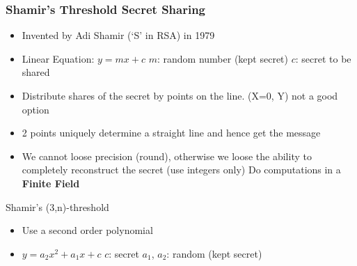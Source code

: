 \subsubsection{Shamir's Threshold Secret Sharing}
\begin{itemize}
	\item Invented by Adi Shamir (`S' in RSA) in 1979
	\item Linear Equation: $y=mx+c$
	\subitem $m$: random number (kept secret)
	\subitem $c$: secret to be shared
	\item Distribute shares of the secret by points on the line. (X=0, Y) not a good option
	\item 2 points uniquely determine a straight line and hence get the message
	\item We cannot loose precision (round), otherwise we loose the ability to completely reconstruct the secret (use integers only)
	\subitem Do computations in a \textbf{Finite Field}
\end{itemize}
\begin{note}{Shamir's (3,n)-threshold}
	\begin{itemize}
		\item Use a second order polynomial
		\item $y=a_2x^2+a_1x+c$
		\subitem $c$: secret
		\subitem $a_1$, $a_2$: random (kept secret)
	\end{itemize}
\end{note}
